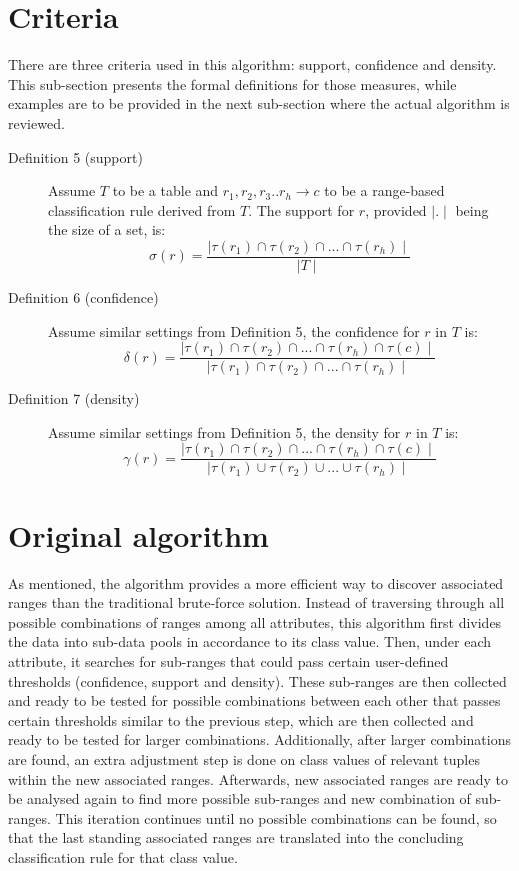 \section{Criteria}

There are three criteria used in this algorithm: support, confidence and density. This sub-section presents the formal definitions for those measures, while examples are to be provided in the next sub-section where the actual algorithm is reviewed.

\begin{description}
\item[Definition 5 (support)]
Assume $T$ to be a table and $r_1, r_2, r_3..r_h \rightarrow c$ to be a range-based classification rule derived from $T$. The support for $r$, provided $\mid . \mid$ being the size of a set, is: 
\[ \sigma(r) = \frac{\mid \tau(r_1) \cap \tau(r_2) \cap ... \cap \tau(r_h) \mid}{\mid T \mid} \] 

\item[Definition 6 (confidence)]
Assume similar settings from Definition 5, the confidence for $r$  in $T$ is:
\[ \delta(r) = \frac{\mid \tau(r_1) \cap \tau(r_2) \cap ... \cap \tau(r_h) \cap \tau(c) \mid}{\mid \tau(r_1) \cap \tau(r_2) \cap ... \cap \tau(r_h) \mid} \] 

\item[Definition 7 (density)]
Assume similar settings from Definition 5, the density for $r$ in $T$ is:
\[ \gamma(r) = \frac{\mid \tau(r_1) \cap \tau(r_2) \cap ... \cap \tau(r_h) \cap \tau(c) \mid}{\mid \tau(r_1) \cup \tau(r_2) \cup ... \cup \tau(r_h) \mid} \] 

\end{description}

\section{Original algorithm}

As mentioned, the algorithm provides a more efficient way to discover associated ranges than the traditional brute-force solution. Instead of traversing through all possible combinations of ranges among all attributes, this algorithm first divides the data into sub-data pools in accordance to its class value. Then, under each attribute, it searches for sub-ranges that could pass certain user-defined thresholds (confidence, support and density). These sub-ranges are then collected and ready to be tested for possible combinations between each other that passes certain thresholds similar to the previous step, which are then collected and ready to be tested for larger combinations. Additionally, after larger combinations are found, an extra adjustment step is done on class values of relevant tuples within the new associated ranges. Afterwards, new associated ranges are ready to be analysed again to find more possible sub-ranges and new combination of sub-ranges. This iteration continues until no possible combinations can be found, so that the last standing associated ranges are translated into the concluding classification rule for that class value. \\

